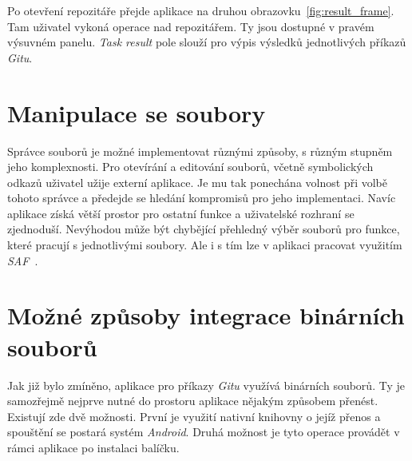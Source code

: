 Po otevření repozitáře přejde aplikace na druhou obrazovku~\ref{fig:result_frame}. Tam uživatel vykoná operace nad repozitářem. Ty jsou dostupné v pravém výsuvném panelu. \emph{Task result} pole slouží pro výpis výsledků jednotlivých příkazů \emph{Gitu}.

\section{Manipulace se soubory}
Správce souborů je možné implementovat různými způsoby, s různým stupněm jeho komplexnosti. Pro otevírání a editování souborů, včetně symbolických odkazů uživatel užije externí aplikace. Je mu tak ponechána volnost při volbě tohoto správce a předejde se hledání kompromisů pro jeho implementaci. Navíc aplikace získá větší prostor pro ostatní funkce a uživatelské rozhraní se zjednoduší. Nevýhodou může být chybějící přehledný výběr souborů pro funkce, které pracují s jednotlivými soubory. Ale i s tím lze v aplikaci pracovat využitím \emph{SAF~}.

\section{Možné způsoby integrace binárních souborů}
Jak již bylo zmíněno, aplikace pro příkazy \emph{Gitu} využívá binárních souborů. Ty je samozřejmě nejprve nutné do prostoru aplikace nějakým způsobem přenést. Existují zde dvě možnosti. První je využití nativní knihovny o jejíž přenos a spouštění se postará systém \emph{Android}. Druhá možnost je tyto operace provádět v rámci aplikace po instalaci balíčku.

